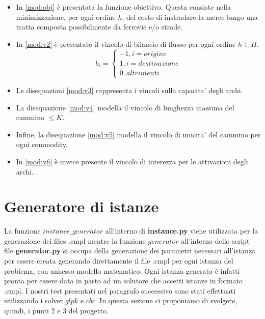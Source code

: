 \documentclass{article}
\begin{document}
\begin{itemize}


    \item In \eqref{mod:obj} è presentata la funzione obiettivo. Questa consiste nella minimizzazione, per ogni ordine $h$, del costo di instradare la merce lungo una tratta composta possibilmente da ferrovie e/o strade.
    
    \item In \eqref{mod:v2} è presentato il vincolo di bilancio di flusso per ogni ordine $h \in H$.
    \begin{equation*}
    b_i =
    \begin{cases}
      -1, i = origine \\
      1, i = destinazione \\
      0, altrimenti
    \end{cases}
    \end{equation*}

    \item Le disequazioni \eqref{mod:v3} rappresenta i vincoli sulla capacita' degli archi.
    \item La disequazione \eqref{mod:v4} modella il vincolo di lunghezza massima del cammino $\leq K$.
    \item Infine, la disequazione \eqref{mod:v5} modella il vincolo di unicita' del cammino per ogni commodity.
    \item In \eqref{mod:v6} \`e invece presente il vincolo di interezza per le attivazioni degli archi.

\end{itemize}


\section{Generatore di istanze}
La funzione $instance\_generator$ all'interno di \textbf{instance.py} viene utilizzata per la generazione dei files .cmpl mentre la funzione $generator$ all'interno dello script file \textbf{generator.py} si occupa della generazione dei parametri necessari all'istanza per essere creata generando direttamente il file .cmpl per ogni istanza del problema, con annesso modello matematico. Ogni istanza generata è infatti pronta per essere data in pasto ad un solutore che accetti istanze in formato .cmpl. I nostri test presentati nel paragrafo successivo sono stati effettuati utilizzando i solver $glpk$ e $cbc$. In questa sezione ci proponiamo di svolgere, quindi, i punti 2 e 3 del progetto.
\end{document}
